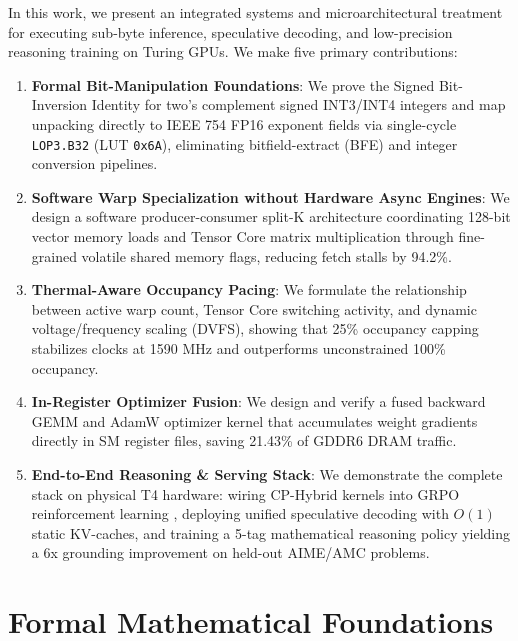 \documentclass[10pt,twocolumn,letterpaper]{article}
\begin{document}
In this work, we present an integrated systems and microarchitectural treatment for executing sub-byte inference, speculative decoding, and low-precision reasoning training on Turing GPUs. We make five primary contributions:
\begin{enumerate}
  \item \textbf{Formal Bit-Manipulation Foundations}: We prove the Signed Bit-Inversion Identity for two's complement signed INT3/INT4 integers and map unpacking directly to IEEE 754 FP16 exponent fields via single-cycle \texttt{LOP3.B32} (LUT \texttt{0x6A}), eliminating bitfield-extract (BFE) and integer conversion pipelines.
  \item \textbf{Software Warp Specialization without Hardware Async Engines}: We design a software producer-consumer split-K architecture coordinating 128-bit vector memory loads and Tensor Core matrix multiplication through fine-grained volatile shared memory flags, reducing fetch stalls by 94.2\%.
  \item \textbf{Thermal-Aware Occupancy Pacing}: We formulate the relationship between active warp count, Tensor Core switching activity, and dynamic voltage/frequency scaling (DVFS), showing that 25\% occupancy capping stabilizes clocks at 1590 MHz and outperforms unconstrained 100\% occupancy.
  \item \textbf{In-Register Optimizer Fusion}: We design and verify a fused backward GEMM and AdamW optimizer kernel that accumulates weight gradients directly in SM register files, saving 21.43\% of GDDR6 DRAM traffic.
  \item \textbf{End-to-End Reasoning & Serving Stack}: We demonstrate the complete stack on physical T4 hardware: wiring CP-Hybrid kernels into GRPO reinforcement learning \cite{kumar2024grpo}, deploying unified speculative decoding with $O(1)$ static KV-caches, and training a 5-tag mathematical reasoning policy yielding a 6x grounding improvement on held-out AIME/AMC problems.
\end{enumerate}

\section{Formal Mathematical Foundations}
\end{document}
